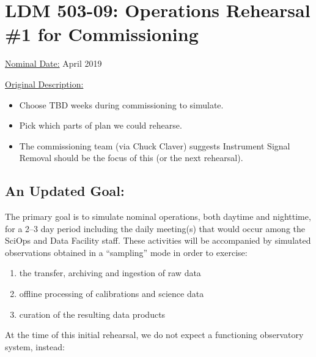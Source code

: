 
\section{LDM 503-09: Operations Rehearsal \#1 for Commissioning}

\underline{Nominal Date:} April 2019

\underline{Original Description:}
\begin{itemize}[topsep=-8pt]
\item Choose TBD weeks during commissioning to simulate.
\item Pick which parts of plan we could rehearse.
\item The commissioning team (via Chuck Claver) suggests Instrument Signal Removal should be the focus 
of this (or the next rehearsal).
\end{itemize}

\subsection{An Updated Goal:}

The primary goal is to simulate nominal operations, both daytime and nighttime, for a 2--3 day 
period including the daily meeting(s) that would occur among the SciOps and 
Data Facility staff.  These activities will be accompanied by simulated 
observations obtained in a ``sampling'' mode in order to exercise:
\begin{enumerate}[topsep=-8pt]
\item the transfer, archiving and ingestion of raw data
\item offline processing of calibrations and science data
\item curation of the resulting data products
\end{enumerate}

At the time of this initial rehearsal, we do not expect a functioning 
observatory system, instead:

